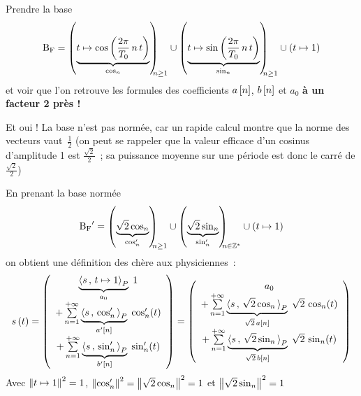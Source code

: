 \begin{exercice}
  Prendre la base
  $$\Bf=\p{\caCest{t\mapsto \cos\p{\frac{2
          \pi}{T_0}\,n\,t}}{\cos_n}}_{\!\!\!\!n\geq 1}\cup
  \p{\caCest{t\mapsto \sin\p{\frac{2
          \pi}{T_0}\,n\,t}}{\sin_n}}_{\!\!\!\!n\geq 1}\cup \p{t\mapsto
    1}$$ et voir que l'on retrouve les formules des coefficients
  $a\left[n\right]$, $b\left[n\right]$ et $a_0$ \textbf{à un facteur 2 près !}
  
  Et oui ! La base n'est pas normée, car un rapide calcul montre que la
  norme des vecteurs vaut~$\frac{1}{2}$ (on peut se rappeler que la
  valeur efficace d'un cosinus d'amplitude 1 est
  $\frac{\sqrt{2}}{2}$~; sa puissance moyenne sur une période est donc
  le carré de $\frac{\sqrt{2}}{2}$)

  En prenant la base
  normée
  $$\Bf'=\p{\caCest{\sqrt{2}\cos_n}{\cos_n'}}_{\!\!\!\!n\geq 1}\cup
  \p{\caCest{\sqrt{2}\sin_n}{\sin_n'}}_{\!\!\!\!n\in\Z^*} \cup
  \p{t\mapsto 1}$$ on obtient une définition des \sdf{} chère aux
  physiciennes~:
  \begin{equation}
    \label{eq:sdf_normee}
    s\left(t\right) = \left(
      \begin{array}{c}
        {\underbrace{\langle s\,,\,t\mapsto 1{\rangle}_P}_{a_0}\;1} \\
        + \sum\limits_{n=1}^{+\infty}{\underbrace{\langle s\,,\,\cos_n'{\rangle}_P}_{a'\left[n\right]}\;\cos_n'(t)}  \\
        + \sum\limits_{n=1}^{+\infty}{\underbrace{\langle s\,,\,\sin_n'{\rangle}_P}_{b'\left[n\right]}\;\sin_n'(t)}     
      \end{array}\right)
    = \left(
      \begin{array}{c}
        a_0  \\
        + \sum\limits_{n=1}^{+\infty}{\underbrace{\langle s\,,\,\sqrt{2}\cos_n{\rangle}_P}_{\sqrt{2}\,a\left[n\right]}\;\sqrt{2}\,\cos_n(t)}  \\
        + \sum\limits_{n=1}^{+\infty}{\underbrace{\langle s\,,\,\sqrt{2}\sin_n{\rangle}_P}_{\sqrt{2}\,b\left[n\right]}\;\sqrt{2}\,\sin_n(t)}
      \end{array}\right)
  \end{equation}
  Avec $\left\|t\mapsto 1\right\|^2=1$,
  $\left\|\cos_n'\right\|^2=\left\|\sqrt{2}\cos_n\right\|^2=1$ et
  $\left\|\sqrt{2}\sin_n\right\|^2=1$


\end{exercice}
